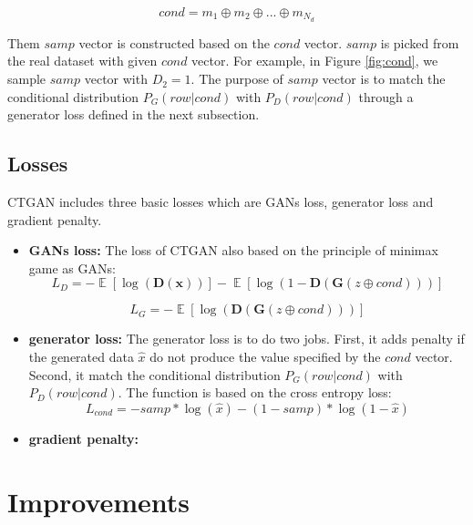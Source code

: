 \documentclass{article}
\begin{document}
\begin{equation}
	cond = m_1 \oplus m_2 \oplus ... \oplus m_{N_d}
\end{equation}


Them $samp$ vector is constructed based on the $cond$ vector. $samp$ is picked from the real dataset with given $cond$ vector. For example, in Figure \ref{fig:cond}, we sample $samp$ vector with $D_2 = 1$. The purpose of $samp$ vector is to match the conditional distribution $\mathit{P_G}(row|cond)$ with $\mathit{P_D}(row|cond)$ through a generator loss defined in the next subsection.


\subsection{Losses}

\ac{CTGAN} includes three basic losses which are \ac{GANs} loss, generator loss and gradient penalty.
 \begin{itemize}
 	\item \textbf{GANs loss:} The loss of \ac{CTGAN} also based on the principle of minimax game as \ac{GANs}:
 	\begin{equation}
 	L_D = - \mathop{\mathbb{E}}[\log(\mathbf{D(x)})]  - \mathop{\mathbb{E}}[\log(1 - \mathbf{D}(\mathbf{G}(z \oplus cond)))]
 	\end{equation}
 	
 	\begin{equation}
 	L_G = - \mathop{\mathbb{E}}[\log(\mathbf{D}(\mathbf{G}(z \oplus cond)))]
 	\end{equation}
 	\item \textbf{generator loss:} The generator loss is to do two jobs. First, it adds penalty if the generated data $\hat{x}$ do not produce the value specified by the $cond$ vector. Second, it match the conditional distribution $\mathit{P_G}(row|cond)$ with $\mathit{P_D}(row|cond)$. The function is based on the cross entropy loss:
 	\begin{equation}
 	L_{cond} = -samp * \log(\hat{x}) - ( 1- samp) * \log(1-\hat{x})
 	\end{equation}
 	
 	\item \textbf{gradient penalty:} 
 \end{itemize} 

\section{Improvements}
\end{document}
